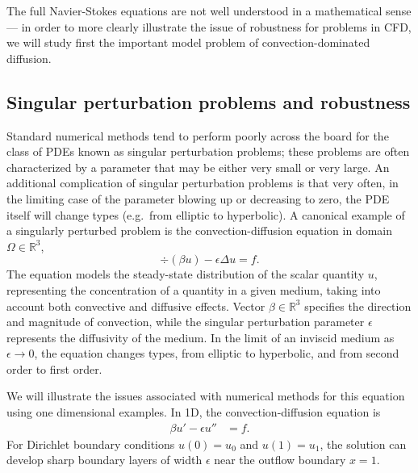 The full Navier-Stokes equations are not well understood in a mathematical sense --- in order to more clearly illustrate the issue of robustness for problems in CFD, we will study first the important model problem of convection-dominated diffusion.  

\subsection{Singular perturbation problems and robustness}


Standard numerical methods tend to perform poorly across the board for the class of PDEs known as singular perturbation problems; these problems are often characterized by a parameter that may be either very small or very large.  An additional complication of singular perturbation problems is that very often, in the limiting case of the parameter blowing up or decreasing to zero, the PDE itself will change types (e.g.\ from elliptic to hyperbolic).  A canonical example of a singularly perturbed problem is the convection-diffusion equation in domain $\Omega \in \mathbb{R}^3$,
\[
\div \left(\beta u\right) - \epsilon \Delta u = f.
\]
The equation models the steady-state distribution of the scalar quantity $u$, representing the concentration of a quantity in a given medium, taking into account both convective and diffusive effects. Vector $\beta \in \mathbb{R}^3$ specifies the direction and magnitude of convection, while the singular perturbation parameter $\epsilon$ represents the diffusivity of the medium. In the limit of an inviscid medium as $\epsilon\rightarrow 0$, the equation changes types, from elliptic to hyperbolic, and from second order to first order.

We will illustrate the issues associated with numerical methods for this equation using one dimensional examples.  In 1D, the convection-diffusion equation is
\begin{align*}
\beta u'-\epsilon u'' &= f.
\end{align*}
For Dirichlet boundary conditions $u(0)=u_0$ and $u(1)= u_1$, the solution can develop sharp boundary layers of width $\epsilon$ near the outflow boundary $x=1$. 

